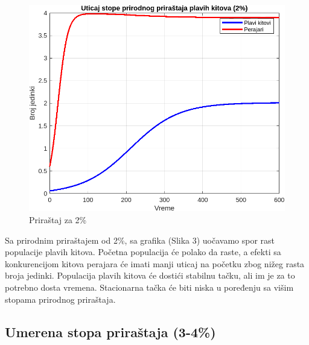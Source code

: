 \documentclass[a4paper]{article}
\begin{document}
{	\begin{figure}[h]
		\centering
		\begin{minipage}[h]{0.45\linewidth}
			\centering
			\includegraphics[width=\textwidth]{uticaj2.png}
			\caption{Priraštaj za 2\%}
			\label{slika1: uticaj2}
		\end{minipage}
	\end{figure}

	Sa prirodnim priraštajem od 2\%, sa grafika (Slika 3) uočavamo spor rast populacije plavih kitova. Početna populacija će polako da raste, a efekti sa konkurencijom kitova perajara će imati manji uticaj na početku zbog nižeg rasta broja jedinki. Populacija plavih kitova će dostići stabilnu tačku, ali im je za to potrebno dosta vremena. Stacionarna tačka će biti niska u poređenju sa višim stopama prirodnog priraštaja.
	
	
	\subsection{Umerena stopa priraštaja (3-4\%)}
	\label{sec: umerena-stopa-prirastaja}
	
}
\end{document}
